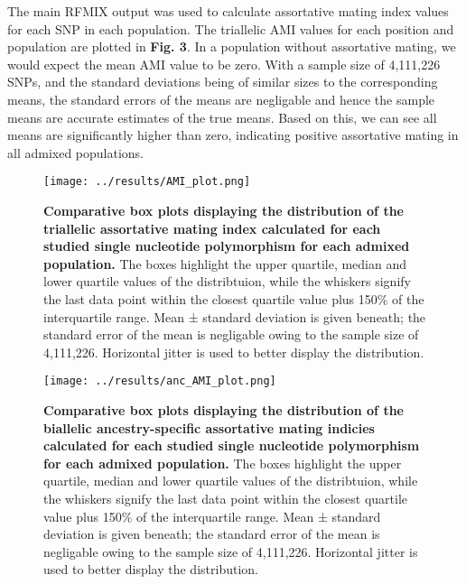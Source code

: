 \documentclass[11pt]{article}
\begin{document}
The main RFMIX output was used to calculate assortative mating index values for each SNP in each population. The triallelic AMI values for each position and population are plotted in \textbf{Fig. 3}. In a population without assortative mating, we would expect the mean AMI value to be zero. With a sample size of 4,111,226 SNPs, and the standard deviations being of similar sizes to the corresponding means, the standard errors of the means are negligable and hence the sample means are accurate estimates of the true means. Based on this, we can see all means are significantly higher than zero, indicating positive assortative mating in all admixed populations.



\vspace{3mm}
\begin{figure}[htb!]%
    \centering
    \texttt{[image: ../results/AMI\_plot.png]} 
    \vspace{.1cm}
    \caption{\textbf{
        Comparative box plots displaying the distribution of the triallelic assortative mating index calculated for each studied single nucleotide polymorphism for each admixed population.
    }
        The boxes highlight the upper quartile, median and lower quartile values of the distribtuion, while the whiskers signify the last data point within the closest quartile value plus 150\% of the interquartile range. Mean ± standard deviation is given beneath; the standard error of the mean is negligable owing to the sample size of 4,111,226. Horizontal jitter is used to better display the distribution.
    }
\end{figure}




\begin{figure}[p]%
    \centering
    \texttt{[image: ../results/anc\_AMI\_plot.png]} 
    \vspace{.2cm}
    \caption{\textbf{
        Comparative box plots displaying the distribution of the biallelic ancestry-specific assortative mating indicies calculated for each studied single nucleotide polymorphism for each admixed population.
    }
        The boxes highlight the upper quartile, median and lower quartile values of the distribtuion, while the whiskers signify the last data point within the closest quartile value plus 150\% of the interquartile range. Mean ± standard deviation is given beneath; the standard error of the mean is negligable owing to the sample size of 4,111,226. Horizontal jitter is used to better display the distribution.
    }
\end{figure}
\end{document}
